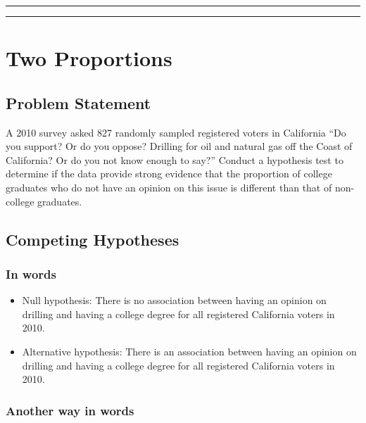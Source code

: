 \documentclass[]{tufte-book}
\let\oldrule=\rule
\renewcommand{\rule}[1]{\oldrule{\linewidth}}
\begin{document}
\begin{center}\rule{0.5\linewidth}{\linethickness}\end{center}

\begin{center}\rule{0.5\linewidth}{\linethickness}\end{center}

\section{Two Proportions}\label{two-proportions}

\subsection{Problem Statement}\label{problem-statement-2}

A 2010 survey asked 827 randomly sampled registered voters in California
``Do you support? Or do you oppose? Drilling for oil and natural gas off
the Coast of California? Or do you not know enough to say?'' Conduct a
hypothesis test to determine if the data provide strong evidence that
the proportion of college graduates who do not have an opinion on this
issue is different than that of non-college graduates. \citep[Tweaked a
bit from][ {[}Chapter 6{]}]{isrs2014}

\subsection{Competing Hypotheses}\label{competing-hypotheses-2}

\subsubsection{In words}\label{in-words-2}

\begin{itemize}
\item
  Null hypothesis: There is no association between having an opinion on
  drilling and having a college degree for all registered California
  voters in 2010.
\item
  Alternative hypothesis: There is an association between having an
  opinion on drilling and having a college degree for all registered
  California voters in 2010.
\end{itemize}

\subsubsection{Another way in words}\label{another-way-in-words}
\end{document}
